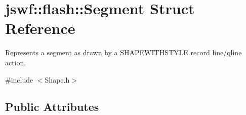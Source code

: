 \hypertarget{structjswf_1_1flash_1_1_segment}{\section{jswf\+:\+:flash\+:\+:Segment Struct Reference}
\label{structjswf_1_1flash_1_1_segment}
}


Represents a segment as drawn by a {\ttfamily S\+H\+A\+P\+E\+W\+I\+T\+H\+S\+T\+Y\+L\+E} record {\ttfamily line}/{\ttfamily qline} action.  




{\ttfamily \#include $<$Shape.\+h$>$}

\subsection*{Public Attributes}
